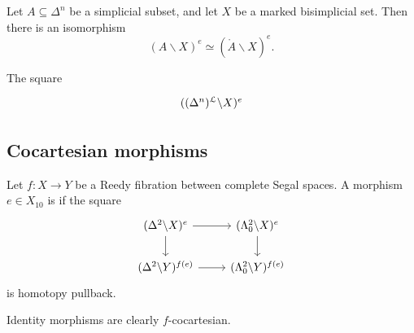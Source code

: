 \documentclass[main.tex]{subfiles}
\begin{document}
\begin{lemma}
  Let $A \subseteq \Delta^{n}$ be a simplicial subset, and let $X$ be a marked bisimplicial set. Then there is an isomorphism
  \begin{equation*}
    (A \backslash X)^{e} \simeq (\mathring{A} \backslash X)^{e}.
  \end{equation*}
\end{lemma}

\begin{lemma}
  The square
  \begin{equation*}
    \begin{tikzcd}
      ((\Delta^{n})^{\mathcal{L}} \backslash X)^{e}
    \end{tikzcd}
  \end{equation*}
\end{lemma}

\subsection{Cocartesian morphisms}
\label{ssc:cocartesian_morphisms}

\begin{definition}
  Let $f\colon X \to Y$ be a Reedy fibration between complete Segal spaces. A morphism $e \in X_{10}$ is  if the square
  \begin{equation*}
    \begin{tikzcd}
      (\Delta^{2} \backslash X)^{e}
      \arrow[r]
      \arrow[d]
      & (\Lambda^{2}_{0} \backslash X)^{e}
      \arrow[d]
      \\
      (\Delta^{2} \backslash Y)^{f(e)}
      \arrow[r]
      & (\Lambda^{2}_{0} \backslash Y)^{f(e)}
    \end{tikzcd}
  \end{equation*}
  is homotopy pullback.
\end{definition}

\begin{example}
  Identity morphisms are clearly $f$-cocartesian.
\end{example}
\end{document}
